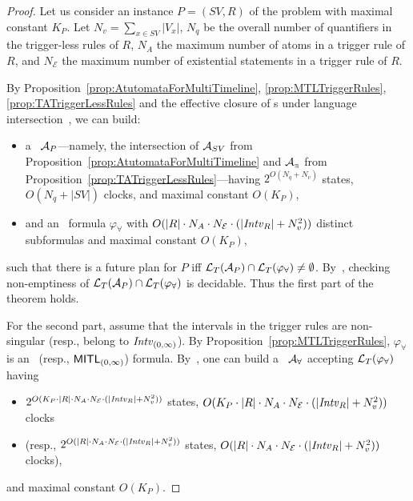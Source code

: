 \begin{proof} 
Let us consider an instance $P=(SV,R)$ of the problem with maximal constant $K_P$.
Let $N_v = \sum_{x\in SV}|V_x|$, $N_q$ be the overall number of quantifiers in the trigger-less  rules of $R$, 
$N_A$ the maximum number of atoms in a trigger rule of $R$, and $N_{\mathcal{E}}$ the maximum number of existential statements in a trigger rule of $R$.

By Proposition~\ref{prop:AtutomataForMultiTimeline}, \ref{prop:MTLTriggerRules}, \ref{prop:TATriggerLessRules} and the effective closure
of \TA s under language intersection~\cite{ALUR1994183}, we can build:
\begin{itemize}
    \item a \TA\ $\mathcal{A}_P$---namely, the intersection of $\mathcal{A}_{SV}$ from Proposition~\ref{prop:AtutomataForMultiTimeline} and $\mathcal{A}_{_\exists}$ from Proposition~\ref{prop:TATriggerLessRules}---having $2^{O(N_q+N_v)}$ states, $O(N_q+|SV|)$ clocks, and maximal constant $O(K_P)$,
    \item and an \MTL\ formula $\varphi_\forall$ with $O(|R|\cdot N_A \cdot N_{\mathcal{E}}\cdot (|{\mathit{Intv}}_R| + N_v^2))$ distinct subformulas and maximal constant $O(K_P)$,
\end{itemize}
    such that there is a future plan for $P$ iff
${\mathcal{L}_T}(\mathcal{A}_P)\cap{\mathcal{L}_T}(\varphi_\forall)\neq \emptyset$. By~\cite{OuaknineW07}, checking non-emptiness of  ${\mathcal{L}_T}(\mathcal{A}_P)\cap{\mathcal{L}_T}(\varphi_\forall)$ is decidable. Thus the first part of the theorem holds. 

For the
second part, assume that  the intervals in %
the trigger rules are non-singular
(resp., belong to ${\mathit{Intv}}_{(0,\infty)}$). By Proposition~\ref{prop:MTLTriggerRules}, $\varphi_\forall$ is an \MITL\ (resp., $\text{\sffamily MITL}_{(0,\infty)}$) formula. By~\cite{Alur:1996}, one can build a \TA\ $\mathcal{A}_\forall$ accepting ${\mathcal{L}_T}(\varphi_\forall)$ having 
\begin{itemize}
    \item $2^{O(K_P\cdot |R|\cdot N_A \cdot N_{\mathcal{E}}\cdot (|{\mathit{Intv}}_R| + N_v^2))} $ states, $O(K_P\cdot |R|\cdot N_A \cdot N_{\mathcal{E}}\cdot (|{\mathit{Intv}}_R| + N_v^2))$ clocks
    \item (resp., $2^{O(|R|\cdot N_A \cdot N_{\mathcal{E}}\cdot (|{\mathit{Intv}}_R| + N_v^2))}$ states, $O(|R|\cdot N_A \cdot N_{\mathcal{E}}\cdot (|{\mathit{Intv}}_R| + N_v^2))$ clocks),
\end{itemize}
and maximal constant $O(K_P)$.


\end{proof}
